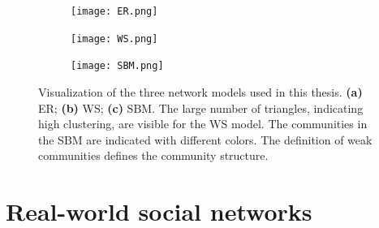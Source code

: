 \documentclass[11 pt , letterpaper , twoside , openright]{book}
\begin{document}
\begin{figure}[H]
  \begin{subfigure}[b]{0.32\textwidth}
    \caption{}
    \texttt{[image: ER.png]}
  \end{subfigure}
  \begin{subfigure}[b]{0.32\textwidth}
    \caption{}
    \texttt{[image: WS.png]}
  \end{subfigure}
  \begin{subfigure}[b]{0.32\textwidth}
    \caption{}
    \texttt{[image: SBM.png]}
  \end{subfigure}
  \captionsetup{format=plain}
  \caption[Visualization of the three network models used in this thesis; (i) ER; (ii) WS and (iii) SBM.]{Visualization of the three network models used in this thesis. \textbf{(a)} ER; \textbf{(b)} WS; \textbf{(c)} SBM. The large number of triangles, indicating high clustering, are visible for the WS model. The communities in the SBM are indicated with different colors. The definition of weak communities defines the community structure.}
\label{netRepr}
\end{figure}

\section{Real-world social networks}\label{realWorld}
\end{document}
